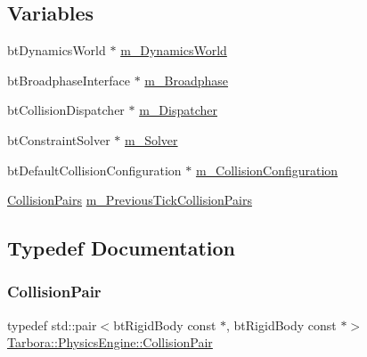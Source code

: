 \subsection*{Variables}
\begin{DoxyCompactItemize}
\item 
bt\+Dynamics\+World $\ast$ \hyperlink{namespaceTarbora_1_1PhysicsEngine_ad71e472576f1233d63c8097d093452d8}{m\+\_\+\+Dynamics\+World}
\item 
bt\+Broadphase\+Interface $\ast$ \hyperlink{namespaceTarbora_1_1PhysicsEngine_aad0a3208848771a8315e5312545c5cb3}{m\+\_\+\+Broadphase}
\item 
bt\+Collision\+Dispatcher $\ast$ \hyperlink{namespaceTarbora_1_1PhysicsEngine_a42f89e700be9b0bef8bff4a45c22210f}{m\+\_\+\+Dispatcher}
\item 
bt\+Constraint\+Solver $\ast$ \hyperlink{namespaceTarbora_1_1PhysicsEngine_a498afcd43ca7dc066fc7d8933d9ece84}{m\+\_\+\+Solver}
\item 
bt\+Default\+Collision\+Configuration $\ast$ \hyperlink{namespaceTarbora_1_1PhysicsEngine_a80854f5ca1d38da19b98bc3991833545}{m\+\_\+\+Collision\+Configuration}
\item 
\hyperlink{namespaceTarbora_1_1PhysicsEngine_af696c3b94fb96f65c63f51e52b0e7238}{Collision\+Pairs} \hyperlink{namespaceTarbora_1_1PhysicsEngine_a2d6e21958893f5904e8a862eb3428359}{m\+\_\+\+Previous\+Tick\+Collision\+Pairs}
\end{DoxyCompactItemize}


\subsection{Typedef Documentation}
\mbox{\label{namespaceTarbora_1_1PhysicsEngine_a4f1d409d44b0a7cde617d3a30ed02b02}} 
\subsubsection{\texorpdfstring{Collision\+Pair}{CollisionPair}}
{\footnotesize\ttfamily typedef std\+::pair$<$bt\+Rigid\+Body const $\ast$, bt\+Rigid\+Body const $\ast$$>$ \hyperlink{namespaceTarbora_1_1PhysicsEngine_a4f1d409d44b0a7cde617d3a30ed02b02}{Tarbora\+::\+Physics\+Engine\+::\+Collision\+Pair}}

